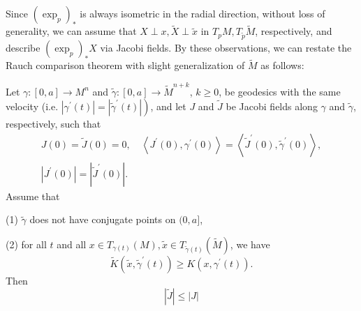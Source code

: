 \documentclass{ctexart}
\begin{document}
Since $(\exp_{p})_*$ is always isometric in the radial direction, without loss of generality, we can assume that $X \perp x, \widetilde{X} \perp \widetilde{x}$ 
in $T_pM, T_{\widetilde{p}}\widetilde{M}$, respectively, and describe $(\exp_{p})_* X$ via Jacobi fields. 
By these observations, we can restate the Rauch comparison theorem with slight generalization of $\widetilde{M}$ as follows:
\begin{theorem}
  Let $\gamma:[0, a] \rightarrow M^n$ and $\tilde{\gamma}:[0, a] \rightarrow \tilde{M}^{n+k}$, $k \geq 0$, be geodesics with the same velocity (i.e. $\left.\left|\gamma^{\prime}(t)\right|=\left|\tilde{\gamma}^{\prime}(t)\right|\right)$, and let $J$ and $\tilde{J}$ be Jacobi fields along $\gamma$ and $\tilde{\gamma}$, respectively, such that
  $$
  \begin{gathered}
  J(0)=\tilde{J}(0)=0, \quad\left\langle J^{\prime}(0), \gamma^{\prime}(0)\right\rangle=\left\langle\tilde{J}^{\prime}(0), \tilde{\gamma}^{\prime}(0)\right\rangle, \\
  \left|J^{\prime}(0)\right|=\left|\tilde{J}^{\prime}(0)\right| .
  \end{gathered}
  $$
  Assume that 

  (1) $\tilde{\gamma}$ does not have conjugate points on $(0, a]$, 

  (2) for all $t$ and all $x \in T_{\gamma(t)}(M), \tilde{x} \in T_{\tilde{\gamma}(t)}(\tilde{M})$, we have
  $$
  \tilde{K}\left(\tilde{x}, \tilde{\gamma}^{\prime}(t)\right) \geq K\left(x, \gamma^{\prime}(t)\right). 
  $$
  Then
  $$
  |\tilde{J}| \leq|J|
  $$
\end{theorem}
\end{document}
